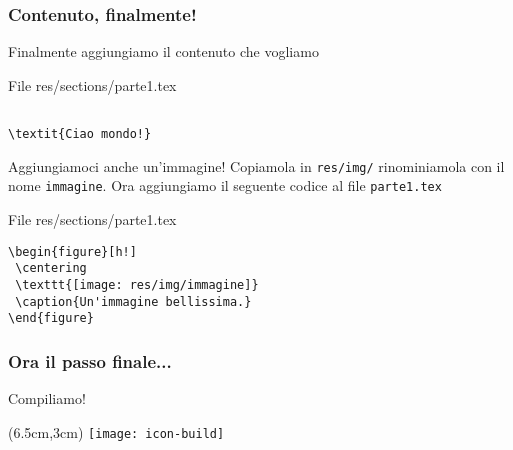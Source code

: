 \begin{frame}[fragile]
 
 \frametitle{Contenuto, finalmente!}
 
 Finalmente aggiungiamo il contenuto che vogliamo
 
 \begin{esempio}{File res/sections/parte1.tex}
\begin{code}
\begin{verbatim}

\textit{Ciao mondo!}
\end{verbatim}
\end{code}
\end{esempio}
    

 Aggiungiamoci anche un'immagine!
 Copiamola in \texttt{res/img/} rinominiamola con il nome \texttt{immagine}. 
Ora aggiungiamo il seguente codice al file \texttt{parte1.tex}


\begin{esempio}{File res/sections/parte1.tex}
\begin{code}
\begin{verbatim}
\begin{figure}[h!]
 \centering
 \texttt{[image: res/img/immagine]}
 \caption{Un'immagine bellissima.}
\end{figure}
\end{verbatim}
\end{code}
\end{esempio}


\end{frame}

\begin{frame}
 \frametitle{Ora il passo finale...}
 
 \huge Compiliamo!
 
 
 \begin{textblock*}{5cm}(6.5cm,3cm)
   \texttt{[image: icon-build]}
 \end{textblock*}
\end{frame}
